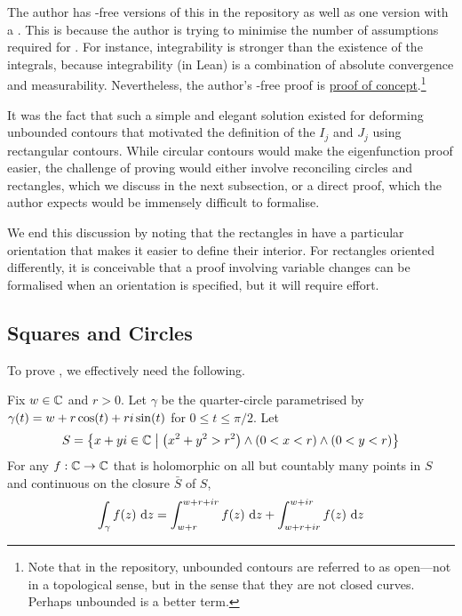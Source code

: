The author has \sorry-free versions of this in the repository as well as one version with a \sorry. This is because the author is trying to minimise the number of assumptions required for . For instance, integrability is stronger than the existence of the integrals, because integrability (in Lean) is a combination of absolute convergence and measurability. Nevertheless, the author's \sorry-free proof is \href{https://github.com/thefundamentaltheor3m/Sphere-Packing-Lean/blob/704c085b1251cc0c208cc373f4e6105af359edd4/SpherePacking/ForMathlib/CauchyGoursat/OpenRectangular.lean#L162}{proof of concept}.\footnote{Note that in the repository, unbounded contours are referred to as open---not in a topological sense, but in the sense that they are not closed curves. Perhaps unbounded is a better term.}

It was the fact that such a simple and elegant solution existed for deforming unbounded contours that motivated the definition of the $I_j$ and $J_j$ using rectangular contours. While circular contours would make the eigenfunction proof easier, the challenge of proving  would either involve reconciling circles and rectangles, which we discuss in the next subsection, or a direct proof, which the author expects would be immensely difficult to formalise.

We end this discussion by noting that the rectangles in  have a particular orientation that makes it easier to define their interior. For rectangles oriented differently, it is conceivable that a proof involving variable changes can be formalised when an orientation is specified, but it will require effort.

\subsection{Squares and Circles}

To prove , we effectively need the following.

\begin{boxtheorem}\label{Ch5:Thm:CauchyGoursat_Circle_Rectangle}
    Fix $w \in \mathbb{C}$ and $r > 0$. Let $\gamma$ be the quarter-circle parametrised by $\gamma(t) = w + r\cos\!{\left( t \right)} + r i \sin\!{\left( t \right)}$ for $0 \leq t \leq \pi/2$. Let
    \begin{align*}
        S = \left\{ x + yi \in \mathbb{C} \; \middle\vert \; \left( x^2 + y^2 > r^2 \right) \land \left( 0 < x < r \right) \land \left( 0 < y < r \right) \right\}
    \end{align*}
    For any $f : \mathbb{C} \to \mathbb{C}$ that is holomorphic on all but countably many points in $S$ and continuous on the closure $\bar{S}$ of $S$,
    \begin{align*}
        \int_{\gamma} f(z) \, \operatorname{d}\!{z}
        = \int_{w + r}^{w + r + ir} f(z) \, \operatorname{d}\!{z} + \int_{w + r + ir}^{w + ir} f(z) \, \operatorname{d}\!{z}
    \end{align*}
\end{boxtheorem}

